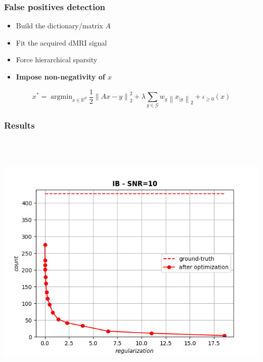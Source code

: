 \documentclass[aspectratio=169]{beamer}
\newcommand{\rd}{\mathbb{R}^d}
\newcommand{\norm}[1]{\left\|#1\right\|}
\newcommand{\normtwosq}[1]{\left\|#1\right\|_2^2}
\newcommand{\onehalf}{\frac{1}{2}}
\DeclareMathOperator*{\argmin}{argmin}
\begin{document}
		\begin{frame}
		\frametitle{False positives detection}
		\begin{itemize}
		\item Build the dictionary/matrix $A$
		\item Fit the acquired dMRI signal
		\item Force hierarchical sparsity
		\pause\item \textbf{Impose non-negativity of $x$}
		\end{itemize}
		
		\pause
		
		\begin{equation}
		\nonumber x^* = \argmin_{x\in \rd}\onehalf\normtwosq{Ax-y} + \lambda \sum_{g\in\mathcal{G}}w_g\norm{x_{|g}}_2 + \iota_{\ge 0}(x)
		\end{equation}
		\end{frame}
		
		\begin{frame}
		\frametitle{Results}
		\quad \\ \quad \\
		\begin{center}
		\includegraphics[width=.7\linewidth]{img/ResultsIBtr.png}
		\end{center}
		\end{frame}
		
\end{document}
